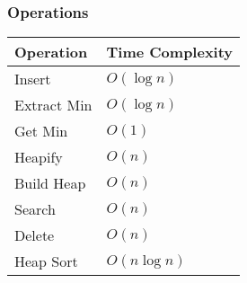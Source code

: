 \subsubsection{Operations}
\begin{summary}
    \begin{center}
        \begin{tabular}{ll}
            \toprule
            \textbf{Operation} & \textbf{Time Complexity} \\
            \midrule
            Insert & $O(\log n)$ \\
            \midrule
            Extract Min & $O(\log n)$ \\
            \midrule
            Get Min & $O(1)$ \\
            \midrule
            Heapify & $O(n)$ \\
            \midrule
            Build Heap & $O(n)$ \\
            \midrule
            Search & $O(n)$ \\
            \midrule
            Delete & $O(n)$ \\
            \midrule
            Heap Sort & $O(n \log n)$ \\
        \end{tabular}
    \end{center}
\end{summary}
\newpage

